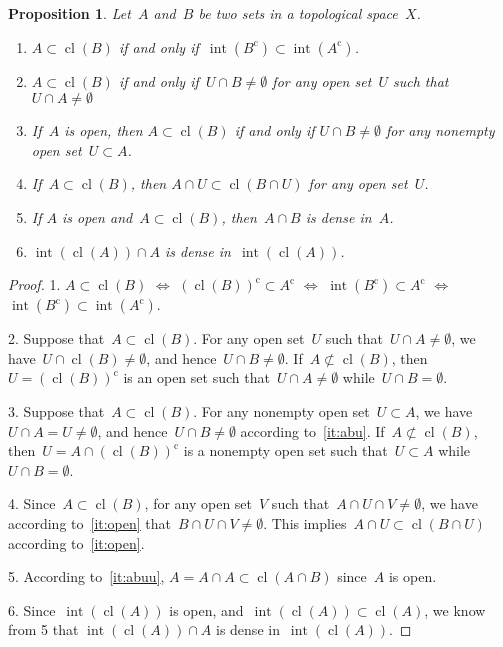 \documentclass[11pt,a4paper]{article}  %
\newtheorem{proposition}{Proposition}[section]
\theoremstyle{definition}
\newcommand{\co}{{\mathrm{c}}}
\newcommand{\ie}{{i.e.}}
\DeclareMathOperator{\inter}{int}
\DeclareMathOperator{\cl}{cl}
\numberwithin{equation}{section}
\begin{document}
\begin{proposition}
  \label{prop:dense}
  Let~$A$ and~$B$ be two sets in a topological space~$X$.
  \begin{enumerate}
    \item $A\subset \cl(B)$ if and only if~$\inter(B^\co ) \subset \inter(A^\co)$.
    \item \label{it:abu} $A \subset \cl(B)$ if and only if~$U\cap B \neq \emptyset$ for any open
      set~$U$ such that~$U \cap  A \neq \emptyset$
    \item \label{it:open} If~$A$ is open, then $A\subset \cl(B)$ if and only if $U\cap B \neq \emptyset$ for any
    nonempty open set~$U\subset A$.
  \item \label{it:abuu} If~$A\subset \cl(B)$, then $A\cap U \subset \cl(B\cap U)$ for any open set~$U$.
   \item \label{it:dense}If $A$ is open and~$A\subset \cl(B)$, then~$A\cap B$ is dense in~$A$.
   \item \label{it:intcl} $\inter(\cl(A))\cap A$ is dense in~$\inter(\cl(A))$.
  \end{enumerate}
\end{proposition}

\begin{proof}
1. $A\subset \cl(B)$ $\Leftrightarrow$ $(\cl(B))^\co \subset A^\co $
$\Leftrightarrow$ $\inter(B^\co)  \subset A^\co$
$\Leftrightarrow$ $\inter(B^\co)  \subset \inter(A^\co)$.

2. Suppose that~$A\subset \cl(B)$. For any open set~$U$ such that~$U\cap A\neq \emptyset$, we
   have~$U\cap \cl(B)\neq \emptyset$, and hence~$U\cap B\neq \emptyset$.
   If~$A\not\subset \cl(B)$, then~$U=(\cl(B))^\co$ is an open set such that~$U\cap A \neq \emptyset$
   while~$U\cap B = \emptyset$.

3. Suppose that~$A\subset \cl(B)$. For any nonempty open set~$U\subset A$, we have~$U\cap A = U\neq \emptyset$,
and hence~$U\cap B\neq \emptyset$ according to~\ref{it:abu}.
   If~$A\not\subset \cl(B)$, then~$U=A\cap (\cl(B))^\co$ is a nonempty open set such that~$U\subset A$
   while~$U\cap B = \emptyset$.

4. Since~$A \subset \cl(B)$, for any open set~$V$ such that~$A\cap U\cap V\neq \emptyset$, we have
according to~\ref{it:open} that~$B\cap U\cap V\neq \emptyset$. This implies~$A\cap U \subset \cl(B\cap U)$
according to~\ref{it:open}.

5. According to~\ref{it:abuu}, $A = A\cap A \subset \cl(A\cap B)$ since~$A$ is open.

6. Since~$\inter(\cl(A))$ is open, and~$\inter(\cl(A)) \subset \cl(A)$, we know from 5 that
$\inter(\cl(A))\cap A$ is dense in~$\inter(\cl(A))$.
\end{proof}
\end{document}
